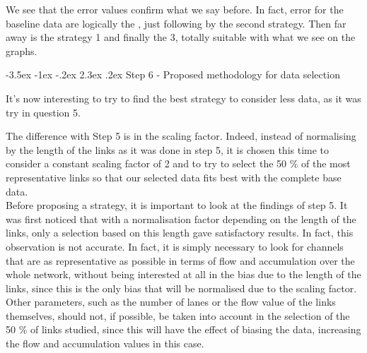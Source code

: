 \documentclass[a4paper, 12pt,oneside]{article}
\makeatletter
\renewcommand{\section}{\@startsection {section}{1}{\z@}%
             {-3.5ex \@plus -1ex \@minus -.2ex}%
             {2.3ex \@plus.2ex}%
             {\normalfont\normalsize\bfseries}}
\makeatother
\begin{document}
We see that the error values confirm what we say before. In fact, error for the baseline data are logically the , just following by the second strategy. Then far away is the strategy 1 and finally the 3, totally suitable with what we see on the graphs.


\section{Step 6 - Proposed methodology for data selection}

It's now interesting to try to find the best strategy to consider less data, as it was try in question 5.
\smallbreak

The difference with Step 5 is in the scaling factor. Indeed, instead of normalising by the length of the links as it was done in step 5, it is chosen this time to consider a constant scaling factor of 2 and to try to select the 50 \% of the most representative links so that our selected data fits best with the complete base data.\\
Before proposing a strategy, it is important to look at the findings of step 5. It was first noticed that with a normalisation factor depending on the length of the links, only a selection based on this length gave satisfactory results. In fact, this observation is not accurate. In fact, it is simply necessary to look for channels that are as representative as possible in terms of flow and accumulation over the whole network, without being interested at all in the bias due to the length of the links, since this is the only bias that will be normalised due to the scaling factor. Other parameters, such as the number of lanes or the flow value of the links themselves, should not, if possible, be taken into account in the selection of the 50 \% of links studied, since this will have the effect of biasing the data, increasing the flow and accumulation values in this case.
\end{document}
